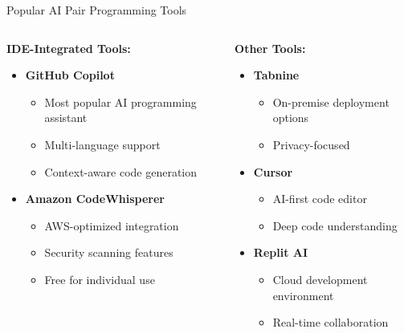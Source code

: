 \documentclass{beamer}
\begin{document}
\begin{frame}[t]{Popular AI Pair Programming Tools}
    \begin{columns}
        \begin{column}{0.5\textwidth}
            \textbf{IDE-Integrated Tools:}
            \begin{itemize}
                \item \textbf{GitHub Copilot}
                \begin{itemize}
                    \item Most popular AI programming assistant
                    \item Multi-language support
                    \item Context-aware code generation
                \end{itemize}
                
                \item \textbf{Amazon CodeWhisperer}
                \begin{itemize}
                    \item AWS-optimized integration
                    \item Security scanning features
                    \item Free for individual use
                \end{itemize}
            \end{itemize}
        \end{column}
        \begin{column}{0.5\textwidth}
            \textbf{Other Tools:}
            \begin{itemize}
                \item \textbf{Tabnine}
                \begin{itemize}
                    \item On-premise deployment options
                    \item Privacy-focused
                \end{itemize}
                
                \item \textbf{Cursor}
                \begin{itemize}
                    \item AI-first code editor
                    \item Deep code understanding
                \end{itemize}
                
                \item \textbf{Replit AI}
                \begin{itemize}
                    \item Cloud development environment
                    \item Real-time collaboration
                \end{itemize}
            \end{itemize}
        \end{column}
    \end{columns}
\end{frame}
\end{document}
